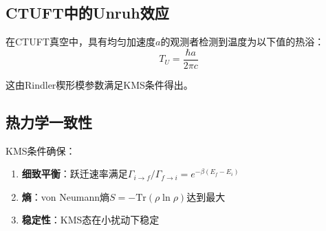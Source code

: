 \subsection{CTUFT中的Unruh效应}

\begin{theorem}[Unruh温度]
在CTUFT真空中，具有均匀加速度$a$的观测者检测到温度为以下值的热浴：
\begin{equation}
    T_U = \frac{\hbar a}{2\pi c}
\end{equation}
\end{theorem}

这由Rindler楔形模参数满足KMS条件得出。

\subsection{热力学一致性}

KMS条件确保：
\begin{enumerate}
    \item \textbf{细致平衡}：跃迁速率满足$\Gamma_{i \to f}/\Gamma_{f \to i} = e^{-\beta(E_f - E_i)}$
    \item \textbf{熵}：von Neumann熵$S = -\text{Tr}(\rho \ln \rho)$达到最大
    \item \textbf{稳定性}：KMS态在小扰动下稳定
\end{enumerate}

